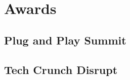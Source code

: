 \documentclass[]{jhearn-resume}
\begin{document}
\begin{minipage}[t]{0.34\textwidth}
\section{Awards}
\subsection{Plug and Play Summit}
\sectionsep

\subsection{Tech Crunch Disrupt}
\sectionsep

\end{minipage} 
\end{document}
